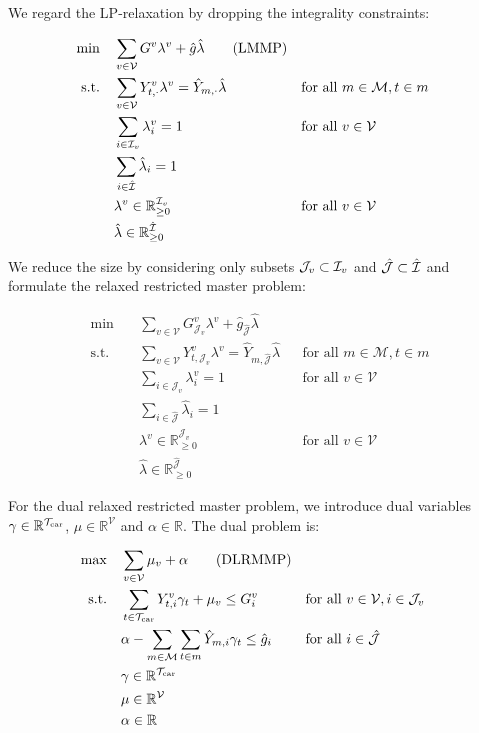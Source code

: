 We regard the LP-relaxation by dropping the integrality constraints:

\begin{align*}
	\min \quad & \sum_{v\in\mathcal{V}}G^v\lambda^v + \hat{g}\hat{\lambda} \tag{LMMP} \label{eq:LMMP} \\
	\text{s.t.} \quad & \sum_{v\in\mathcal{V}} Y^v_{t,\cdot}\lambda^v = \hat{Y}_{m,\cdot}\hat{\lambda} && \text{for all } m\in\mathcal{M},t\in m \\
	& \sum_{i\in\mathcal{I}_v}\lambda_i^v=1 && \text{for all } v\in\mathcal{V}\\
	& \sum_{i\in\hat{\mathcal{I}}}\hat{\lambda}_i= 1 \\
	& \lambda^v\in\mathbb{R}_{\geq 0}^{\mathcal{I}_v} && \text{for all } v\in\mathcal{V} \\
	& \hat{\lambda}\in\mathbb{R}_{\geq 0}^{\hat{\mathcal{I}}}
\end{align*}

We reduce the size by considering only subsets $\mathcal{J}_v\subset\mathcal{I}_v$ and $\hat{\mathcal{J}}\subset\hat{\mathcal{I}}$ and formulate the relaxed restricted master problem:

\begin{align*}
	\min \quad & \sum_{v\in\mathcal{V}}G^v_{\mathcal{J}_v}\lambda^v + \hat{g}_{\hat{\mathcal{J}}}\hat{\lambda} \tag{LRMMP} \\
	\text{s.t.} \quad & \sum_{v\in\mathcal{V}} Y^v_{t,\mathcal{J}_v}\lambda^v = \hat{Y}_{m,\hat{\mathcal{J}}}\hat{\lambda} && \text{for all } m\in\mathcal{M},t\in m \\
	& \sum_{i\in\mathcal{J}_v}\lambda_i^v=1 && \text{for all } v\in\mathcal{V}\\
	& \sum_{i\in\hat{\mathcal{J}}}\hat{\lambda}_i= 1 \\
	& \lambda^v\in\mathbb{R}_{\geq 0}^{\mathcal{J}_v} && \text{for all } v\in\mathcal{V} \\
	& \hat{\lambda}\in\mathbb{R}_{\geq 0}^{\hat{\mathcal{J}}}
\end{align*}

For the dual relaxed restricted master problem, we introduce dual variables $\gamma\in\mathbb{R}^{\mathcal{T}_{\operatorname{car}}}$, $\mu\in\mathbb{R}^{\mathcal{V}}$ and $\alpha\in\mathbb{R}$. The dual problem is:

\begin{align*}
	\max \quad & \sum_{v\in\mathcal{V}}\mu_v + \alpha \tag{DLRMMP} \label{eq:DLRMMP} \\
	\text{s.t.} \quad & \sum_{t\in\mathcal{T}_{\operatorname{car}}} Y^v_{t,i}\gamma_t + \mu_v \leq G^v_i && \text{for all } v\in\mathcal{V},i\in\mathcal{J}_v \\
	& \alpha - \sum_{m\in\mathcal{M}}\sum_{t\in m}\hat{Y}_{m,i}\gamma_t \leq \hat{g}_i && \text{for all } i\in\hat{\mathcal{J}} \\
	& \gamma\in\mathbb{R}^{\mathcal{T}_{\operatorname{car}}} \\
	& \mu\in\mathbb{R}^{\mathcal{V}} \\
	& \alpha\in\mathbb{R}
\end{align*}

